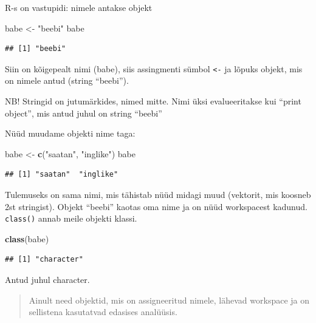 \documentclass[]{book}
\newenvironment{Shaded}{\begin{snugshade}}{\end{snugshade}}
\newcommand{\KeywordTok}[1]{\textcolor[rgb]{0.13,0.29,0.53}{\textbf{#1}}}
\newcommand{\StringTok}[1]{\textcolor[rgb]{0.31,0.60,0.02}{#1}}
\newcommand{\NormalTok}[1]{#1}
\begin{document}
R-s on vastupidi: nimele antakse objekt

\begin{Shaded}
\begin{Highlighting}[]
\NormalTok{babe <-}\StringTok{ "beebi"}
\NormalTok{babe}
\end{Highlighting}
\end{Shaded}

\begin{verbatim}
## [1] "beebi"
\end{verbatim}

Siin on kõigepealt nimi (babe), siis assingmenti sümbol
\texttt{\textless{}-} ja lõpuks objekt, mis on nimele antud (string
``beebi'').

NB! Stringid on jutumärkides, nimed mitte. Nimi üksi evalueeritakse kui
``print object'', mis antud juhul on string ``beebi''

Nüüd muudame objekti nime taga:

\begin{Shaded}
\begin{Highlighting}[]
\NormalTok{babe <-}\StringTok{ }\KeywordTok{c}\NormalTok{(}\StringTok{"saatan"}\NormalTok{, }\StringTok{"inglike"}\NormalTok{)}
\NormalTok{babe}
\end{Highlighting}
\end{Shaded}

\begin{verbatim}
## [1] "saatan"  "inglike"
\end{verbatim}

Tulemuseks on sama nimi, mis tähistab nüüd midagi muud (vektorit, mis
koosneb 2st stringist). Objekt ``beebi'' kaotas oma nime ja on nüüd
workspacest kadunud. \texttt{class()} annab meile objekti klassi.

\begin{Shaded}
\begin{Highlighting}[]
\KeywordTok{class}\NormalTok{(babe)}
\end{Highlighting}
\end{Shaded}

\begin{verbatim}
## [1] "character"
\end{verbatim}

Antud juhul character.

\begin{quote}
Ainult need objektid, mis on assigneeritud nimele, lähevad workspace ja
on sellistena kasutatvad edasises analüüsis.
\end{quote}
\end{document}
